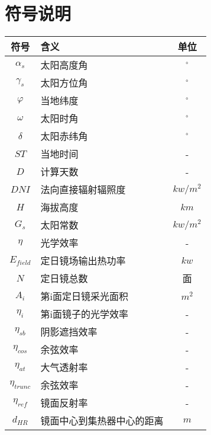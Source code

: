 \documentclass{数学建模}
\begin{document}
\section{符号说明}
\begin{center}
    \begin{longtable}{|c|>{\centering\arraybackslash}p{8cm}|c|}
        \hline
        符号 & 含义 & 单位  \\
        \hline
        $\alpha_s$ & 太阳高度角 & $^\circ$ \\
        \hline
        $\gamma_s$ & 太阳方位角 & $^\circ$ \\
        \hline
        $\varphi $ & 当地纬度 &  $^\circ$\\
        \hline
        $\omega $ & 太阳时角 &  $^\circ$ \\
        \hline
        $\delta $ & 太阳赤纬角 & $^\circ$ \\
        \hline
        $ST$ & 当地时间 & - \\
        \hline
        $D$ & 计算天数 & -\\
        \hline
        $DNI$ & 法向直接辐射辐照度 & $kw/m^2$ \\
        \hline
        $H$ & 海拔高度 & $km$ \\
        \hline
        $G_s$ & 太阳常数 & $kw/m^2$ \\
        \hline
        $\eta $ & 光学效率 & - \\
        \hline
        $E_{field}$ & 定日镜场输出热功率 & $kw$ \\
        \hline
        $N$ & 定日镜总数 & 面 \\
        \hline
        $A_i$ & 第i面定日镜采光面积 & $m^2$ \\
        \hline
        $\eta _i$ & 第i面镜子的光学效率 & - \\
        \hline
        $\eta _{sb}$ & 阴影遮挡效率 & - \\
        \hline
        $\eta _{cos}$ & 余弦效率 & - \\
        \hline
        $\eta _{at}$ & 大气透射率 & - \\
        \hline
        $\eta _{trunc}$ & 余弦效率 & - \\
        \hline
        $\eta _{ref}$ & 镜面反射率 & - \\
        \hline
        $d_{HR}$ & 镜面中心到集热器中心的距离 & $m$ \\
        \hline
    \end{longtable}
    \label{tab:example}
\end{center}
\end{document}
